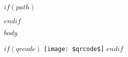 \documentclass[a4paper,11pt]{article}
\begin{document}
$if(path)$

$endif$

\setcounter{secnumdepth}{3}
\setcounter{tocdepth}{1}
\tableofcontents
\newpage
$body$

$if(qrcode)$
  \texttt{[image: \$qrcode\$]}
$endif$
\end{document}
